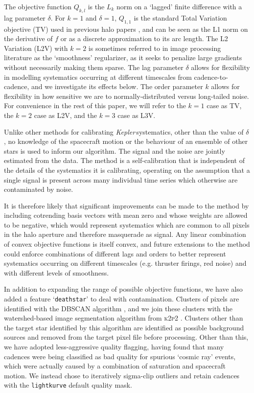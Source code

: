 \documentclass[modern]{aastex62}
\newcommand\kepler{\emph{Kepler}\,}
\begin{document}
The objective function $Q_{k,l}$ is the $L_k$ norm on a `lagged' finite difference with a lag parameter $\delta$. For $k = 1$ and $\delta = 1$, $Q_{1,1}$ is the standard Total Variation objective (TV) used in previous halo papers \citep[e.g.][]{White2017,Farr2018}, and can be seen as the L1 norm on the derivative of $f$ or as a discrete approximation to its arc length. The L2 Variation (L2V) with $k=2$ is sometimes referred to in image processing literature as the `smoothness' regularizer, as it seeks to penalize large gradients without necessarily making them sparse. The lag parameter $\delta$ allows for flexibility in modelling systematics occurring at different timescales from cadence-to-cadence, and we investigate its effects below. The order parameter $k$ allows for flexibility in how sensitive we are to normally-distributed versus long-tailed noise. For convenience in the rest of this paper, we will refer to the $k=1$ case as TV, the $k=2$ case as L2V, and the $k=3$ case as L3V.

Unlike other methods for calibrating \kepler systematics, other than the value of $\delta$, no knowledge of the spacecraft motion or the behaviour of an ensemble of other stars is used to inform our algorithm. The signal and the noise are jointly estimated from the data. The method is a self-calibration that is independent of the details of the systematics it is calibrating, operating on the assumption that a single signal is present across many individual time series which otherwise are contaminated by noise. 

It is therefore likely that significant improvements can be made to the method by including cotrending basis vectors with mean zero and whose weights are allowed to be negative, which would represent systematics which are common to all pixels in the halo aperture and therefore masquerade as signal. Any linear combination of convex objective functions is itself convex, and future extensions to the method could enforce combinations of different lags and orders to better represent systematics occurring on different timescales (e.g. thruster firings, red noise) and with different levels of smoothness.


In addition to expanding the range of possible objective functions, we have also added a feature `\texttt{deathstar}' to deal with contamination. Clusters of pixels are identified with the DBSCAN algorithm \citep[Density-Based Spatial Clustering of Applications with Noise;][]{dbscan}, and we join these clusters with the watershed-based image segmentation algorithm from \textsc{k2p2} \citep{k2p2}. Clusters other than the target star identified by this algorithm are identified as possible background sources and removed from the target pixel file before processing. Other than this, we have adopted less-aggressive quality flagging, having found that many cadences were being classified as bad quality for spurious `cosmic ray' events, which were actually caused by a combination of saturation and spacecraft motion. We instead chose to iteratively sigma-clip outliers and retain cadences with the \texttt{lightkurve} default quality mask.
\end{document}
